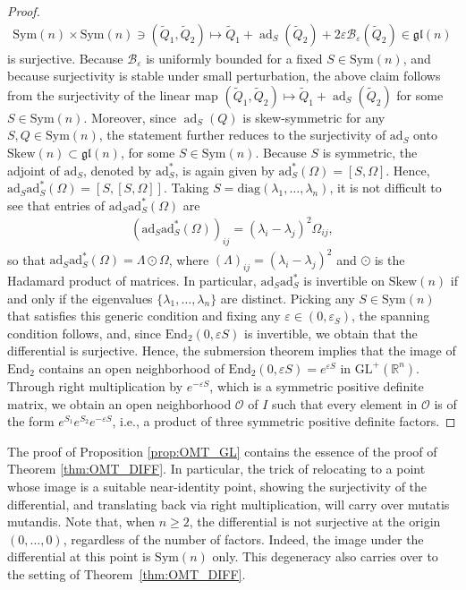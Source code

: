 \documentclass{article}
\theoremstyle{remark}
\newcommand{\GL}{\mathrm{GL}^+(\mathbb{R}^n)}
\newcommand{\Sym}{\mathrm{Sym}(n)}
\newcommand{\Skew}{\mathrm{Skew}(n)}
\begin{document}
\begin{proof}
    \begin{align*}
        \Sym\times\Sym\ni(\tilde{Q}_1,\tilde{Q}_2)\mapsto \tilde{Q}_1 + \operatorname{ad}_S(\tilde{Q}_2) + 2\varepsilon\mathcal{B}_{\varepsilon}(\tilde{Q}_2)\in\mathfrak{gl}(n)
    \end{align*}
    is surjective. Because $\mathcal{B}_{\varepsilon}$ is uniformly bounded for a fixed $S\in\Sym$, and because surjectivity is stable under small perturbation, the above claim follows from the surjectivity of the linear map
   $(\tilde{Q}_1,\tilde{Q}_2)\mapsto \tilde{Q}_1 + \operatorname{ad}_S(\tilde{Q}_2)$
    for some $S\in\Sym$. Moreover, since $\operatorname{ad}_S(Q)$ is skew-symmetric for any $S,Q\in\Sym$, the statement further reduces to the surjectivity of $\mathrm{ad}_S$ onto $\Skew\subset\mathfrak{gl}(n)$, for some $S\in\Sym$. Because $S$ is symmetric, the adjoint of $\mathrm{ad}_S$, denoted by $\mathrm{ad}_S^*$, is again given by $\mathrm{ad}_S^*(\Omega)=[S,\Omega]$. Hence, $\mathrm{ad}_S\mathrm{ad}_S^*(\Omega) = [S,[S,\Omega]]$. Taking $S = \mathrm{diag}(\lambda_1,\dots,\lambda_n)$, it is not difficult to see that entries of $\mathrm{ad}_S\mathrm{ad}_S^*(\Omega)$ are
    \begin{align*}
        (\mathrm{ad}_S\mathrm{ad}_S^*(\Omega))_{ij} = (\lambda_i-\lambda_j)^2 \Omega_{ij},
    \end{align*}
    so that $\mathrm{ad}_S\mathrm{ad}_S^*(\Omega) = \Lambda\odot \Omega$, where $(\Lambda)_{ij}=(\lambda_i-\lambda_j)^2$ and $\odot$ is the Hadamard product of matrices. In particular, $\mathrm{ad}_S\mathrm{ad}_S^*$ is invertible on $\Skew$ if and only if the eigenvalues $\{\lambda_1,\dots,\lambda_n\}$ are distinct. Picking any $S\in\Sym$ that satisfies this generic condition and fixing any $\varepsilon\in(0,\varepsilon_S)$, the spanning condition follows, and, since $\mathrm{End}_2(0,\varepsilon S)$ is invertible, we obtain that the differential is surjective. Hence, the submersion theorem implies that the image of $\mathrm{End}_2$ contains an open neighborhood of $\mathrm{End}_2(0,\varepsilon S)=e^{\varepsilon S}$ in $\GL$. Through right multiplication by $e^{-\varepsilon S}$, which is a symmetric positive definite matrix, we obtain an open neighborhood $\mathcal{O}$ of $I$ such that every element in $\mathcal{O}$ is of the form $e^{S_1}e^{S_2}e^{-\varepsilon S}$, i.e., a product of three symmetric positive definite factors.
\end{proof}
%

%
The proof of Proposition \ref{prop:OMT_GL} contains the essence of the proof of Theorem \ref{thm:OMT_DIFF}. In particular, the trick of relocating to a point whose image is a suitable near-identity point, showing the surjectivity of the differential, and translating back via right multiplication, will carry over mutatis mutandis. Note that, when $n\geq2$, the differential is not surjective at the origin $(0,\dots,0)$, regardless of the number of factors. Indeed, the image under the differential at this point is $\Sym$ only. This degeneracy also carries over to the setting of Theorem~\ref{thm:OMT_DIFF}.
\end{document}
